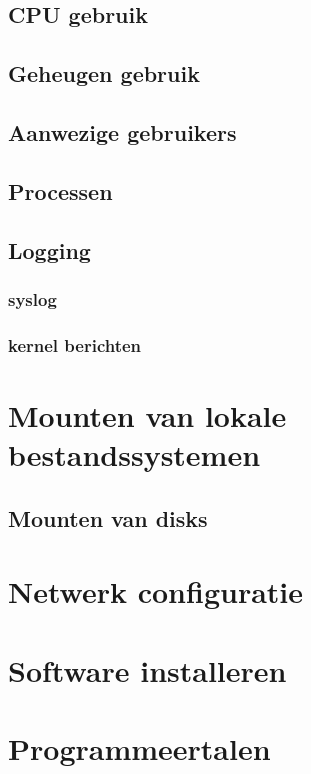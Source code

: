 \documentclass[a4paper,12pt,twoside,openright,titlepage]{book}
\begin{document}
\section{CPU gebruik}

\section{Geheugen gebruik}

\section{Aanwezige gebruikers}

\section{Processen}



\section{Logging}

\subsection{syslog}

\subsection{kernel berichten}


\chapter{Mounten van lokale bestandssystemen}

\section{Mounten van disks}


\chapter{Netwerk configuratie}

\chapter{Software installeren}

\chapter{Programmeertalen}

\end{document}
